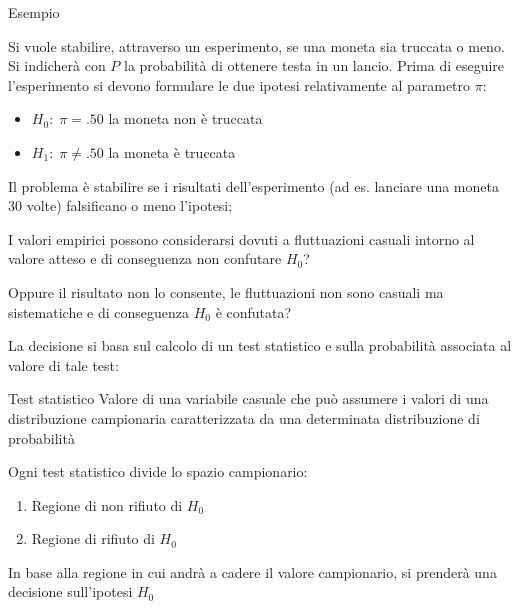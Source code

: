 \documentclass[compress, xcolor=table]{beamer}
\begin{document}
		
	
		\begin{frame}
			\begin{exampleblock}{Esempio}
				
				Si vuole stabilire, attraverso un esperimento, se una moneta sia truccata o meno. Si indicherà con $P$ la probabilità di ottenere testa in un lancio. Prima di eseguire l’esperimento si devono formulare le due ipotesi relativamente al parametro $\pi$:
				
				
				\vspace{3mm}
				\begin{itemize} 
					\item $H_0: \; \pi=.50$ la moneta non è truccata
					\vspace{3mm}
					
					\item $H_1: \; \pi \neq .50$ la moneta è truccata
				\end{itemize}	
			\end{exampleblock}
		\end{frame}
		
		\begin{frame}
			Il problema è stabilire se i risultati dell’esperimento (ad es. lanciare una moneta 30 volte) falsificano o meno l’ipotesi; 
			
			\vspace{3mm}
			I valori empirici possono considerarsi dovuti a fluttuazioni casuali intorno al valore atteso e di conseguenza non confutare $H_0$?
			
			\vspace{3mm}
			Oppure il risultato non lo consente, le fluttuazioni non sono casuali ma sistematiche e di conseguenza $H_0$ è confutata?
			
			
		\end{frame}
		
		\begin{frame}
			La decisione si basa sul calcolo di un test statistico e sulla probabilità associata al valore di tale test: 
			
			\vspace{3mm}
			\begin{block}{Test statistico}
				Valore di una variabile casuale che può assumere i valori di una distribuzione campionaria caratterizzata da una determinata distribuzione di probabilità
			\end{block}
			
			Ogni test statistico divide lo spazio campionario: 
			
			\begin{enumerate}
				\item Regione di non rifiuto di $H_0$
				\item Regione di  rifiuto di $H_0$
			\end{enumerate}
			
			In base alla regione in cui andrà a cadere il valore campionario, si prenderà una decisione sull’ipotesi $H_0$
		\end{frame}
		
\end{document}
